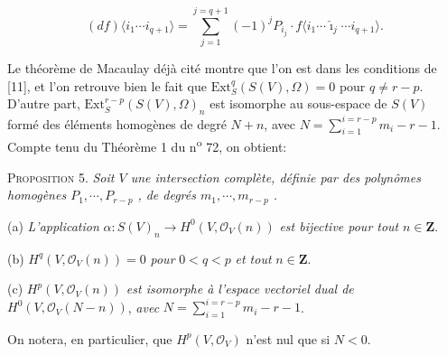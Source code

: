 \begin{equation*}
(df)\langle i_1 \cdots i_{q+1} \rangle = \sum_{j=1}^{j=q+1} (-1)^j P_{i_j} \cdot f\langle i_1 \cdots \hat{\imath}_j \cdots i_{q+1} \rangle.
\end{equation*}

Le théorème de Macaulay déjà cité montre que l'on est dans les conditions de [11], et l'on retrouve bien le fait que $\mathrm{Ext}_S^q(S(V), \Omega) = 0$ pour $q \neq r - p$. D'autre part, $\mathrm{Ext}_S^{r-p}(S(V), \Omega)_n$ est isomorphe au sous-espace de $S(V)$ formé des éléments homogènes de degré $N + n$, avec $N = \sum_{i=1}^{i=r-p} m_i - r - 1$. Compte tenu du Théorème 1 du n\textsuperscript{o} 72, on obtient:

\textsc{Proposition} 5. \textit{Soit $V$ une intersection complète, définie par des polynômes homogènes $P_1 , \cdots , P_{r-p}$ , de degrés $m_1 , \cdots , m_{r-p}$ .}



%
%
%
%
(a) \textit{L'application} $\alpha: S(V)_n \rightarrow H^0(V, \mathcal{O}_V(n))$ \textit{est bijective pour tout} $n \in \mathbf{Z}$.

(b) $H^q(V, \mathcal{O}_V(n)) = 0$ \textit{pour} $0 < q < p$ \textit{et tout} $n \in \mathbf{Z}$.

(c) $H^p(V, \mathcal{O}_V(n))$ \textit{est isomorphe à l'espace vectoriel dual de} $H^0(V, \mathcal{O}_V(N - n))$, \textit{avec} $N = \sum_{i=1}^{i=r-p} m_i - r - 1$.

On notera, en particulier, que $H^p(V, \mathcal{O}_V)$ n'est nul que si $N < 0$.

